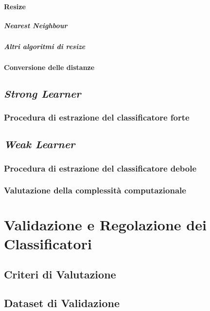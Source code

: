             \subsubsection{Resize}
                \paragraph{Nearest Neighbour}
                \paragraph{Altri algoritmi di resize}
            \subsubsection{Conversione delle distanze}
    \section{\emph{Strong Learner}}
    \label{sec:strong_learner}
        \subsection{Procedura di estrazione del classificatore forte}
    \section{\emph{Weak Learner}}
    \label{sec:weak_learner}
        \subsection{Procedura di estrazione del classificatore debole}
        \subsection{Valutazione della complessità computazionale}

\chapter{Validazione e Regolazione dei Classificatori}
\label{chap:tuning}
    \section{Criteri di Valutazione}
    \label{sec:evaluation_criteria}
    \section{Dataset di Validazione}
    \label{sec:validation_dataset}

